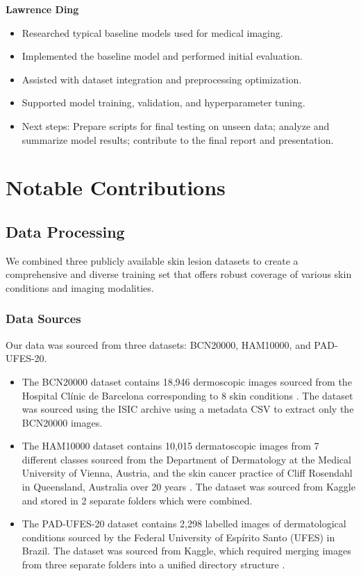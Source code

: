 \documentclass{article} %
\begin{document}
\pagebreak

\textbf{Lawrence Ding}
\begin{itemize}
\item Researched typical baseline models used for medical imaging.
\item Implemented the baseline model and performed initial evaluation.
\item Assisted with dataset integration and preprocessing optimization.
\item Supported model training, validation, and hyperparameter tuning.
\item Next steps: Prepare scripts for final testing on unseen data; analyze and summarize model results; contribute to the final report and presentation.
\end{itemize}


\section{Notable Contributions}

\subsection{Data Processing}

We combined three publicly available skin lesion datasets to create a comprehensive and diverse training set that offers robust coverage of various skin conditions and imaging modalities.

\subsubsection{Data Sources}

Our data was sourced from three datasets: BCN20000, HAM10000, and PAD-UFES-20.

\begin{itemize}
\item The BCN20000 dataset contains 18,946 dermoscopic images sourced from the Hospital Clínic de Barcelona corresponding to 8 skin conditions \citep{isic_bcn20000}. The dataset was sourced using the ISIC archive using a metadata CSV to extract only the BCN20000 images.
\item The HAM10000 dataset contains 10,015 dermatoscopic images from 7 different classes sourced from the Department of Dermatology at the Medical University of Vienna, Austria, and the skin cancer practice of Cliff Rosendahl in Queensland, Australia over 20 years \citep{ham10000_dataset}. The dataset was sourced from Kaggle and stored in 2 separate folders which were combined.
\item The PAD-UFES-20 dataset contains 2,298 labelled images of dermatological conditions sourced by the Federal University of Espírito Santo (UFES) in Brazil. The dataset was sourced from Kaggle, which required merging images from three separate folders into a unified directory structure \citep{pad_ufes_dataset}.
\end{itemize}
\end{document}

